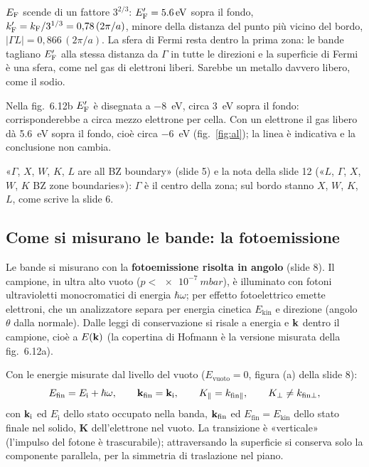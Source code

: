 \documentclass[11pt,a4paper]{article}
\begin{document}
$E_{\mathrm F}$ scende di un fattore $3^{2/3}$: $E_{\mathrm F}'=\SI{5.6}{eV}$ sopra il fondo, $k_{\mathrm F}'=k_{\mathrm F}/3^{1/3}=0{,}78\,(2\pi/a)$, minore della distanza del punto più
vicino del bordo, $|\Gamma L|=0{,}866\,(2\pi/a)$. La sfera di Fermi resta dentro la prima zona: le bande tagliano $E_{\mathrm F}'$ alla stessa distanza da
$\Gamma$ in tutte le direzioni e la superficie di Fermi è una sfera, come nel gas di elettroni liberi. Sarebbe un metallo davvero libero, come il
sodio.

\begin{osservazione}
Nella fig.~6.12b $E_{\mathrm F}'$ è disegnata a \SI{-8}{eV}, circa \SI{3}{eV} sopra il fondo: corrisponderebbe a circa mezzo elettrone per cella. Con un
elettrone il gas libero dà \SI{5.6}{eV} sopra il fondo, cioè circa \SI{-6}{eV} (fig.~\ref{fig:al}); la linea è indicativa e la conclusione non cambia.
\end{osservazione}

\begin{osservazione}
«$\Gamma$, $X$, $W$, $K$, $L$ are all BZ boundary» (slide 5) e la nota della slide 12 («$L$, $\Gamma$, $X$, $W$, $K$ BZ zone boundaries»): $\Gamma$ è
il centro della zona; sul bordo stanno $X$, $W$, $K$, $L$, come scrive la slide 6.
\end{osservazione}

\subsection{Come si misurano le bande: la fotoemissione}\label{sec:arpes}
Le bande si misurano con la \textbf{fotoemissione risolta in angolo}  (slide 8). Il campione,
in ultra alto vuoto ($p<\SI{e-7}{mbar}$), è illuminato con fotoni ultravioletti monocromatici di energia $\hbar\omega$; per effetto fotoelettrico
emette elettroni, che un analizzatore separa per energia cinetica $E_{\mathrm{kin}}$ e direzione (angolo $\theta$ dalla normale). Dalle leggi di
conservazione si risale a energia e $\mathbf k$ dentro il campione, cioè a $E(\mathbf k)$ (la copertina di Hofmann è la versione misurata della fig.~6.12a).

\begin{risultato}
Con le energie misurate dal livello del vuoto ($E_{\mathrm{vuoto}}=0$, figura (a) della slide 8):
\[
E_{\mathrm{fin}}=E_{\mathrm i}+\hbar\omega,\qquad \mathbf k_{\mathrm{fin}}=\mathbf k_{\mathrm i},\qquad K_\parallel=k_{\mathrm{fin}\parallel},\qquad
K_\perp\ne k_{\mathrm{fin}\perp},
\]
con $\mathbf k_{\mathrm i}$ ed $E_{\mathrm i}$ dello stato occupato nella banda, $\mathbf k_{\mathrm{fin}}$ ed $E_{\mathrm{fin}}=E_{\mathrm{kin}}$ dello stato finale nel
solido, $\mathbf K$ dell'elettrone nel vuoto. La transizione è «verticale» (l'impulso del fotone è trascurabile); attraversando la superficie si
conserva solo la componente parallela, per la simmetria di traslazione nel piano.
\end{risultato}
\end{document}
